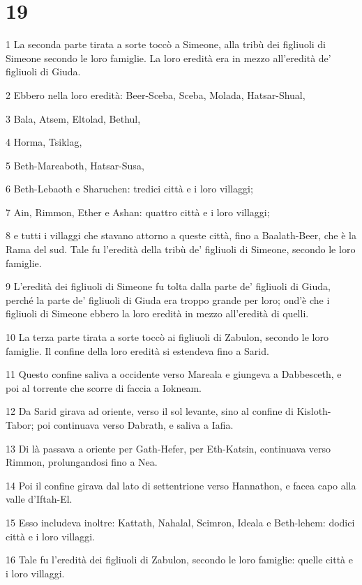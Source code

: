 \chapter{19}

\par 1 La seconda parte tirata a sorte toccò a Simeone, alla tribù dei figliuoli di Simeone secondo le loro famiglie. La loro eredità era in mezzo all'eredità de' figliuoli di Giuda.
\par 2 Ebbero nella loro eredità: Beer-Sceba, Sceba, Molada, Hatsar-Shual,
\par 3 Bala, Atsem, Eltolad, Bethul,
\par 4 Horma, Tsiklag,
\par 5 Beth-Mareaboth, Hatsar-Susa,
\par 6 Beth-Lebaoth e Sharuchen: tredici città e i loro villaggi;
\par 7 Ain, Rimmon, Ether e Ashan: quattro città e i loro villaggi;
\par 8 e tutti i villaggi che stavano attorno a queste città, fino a Baalath-Beer, che è la Rama del sud. Tale fu l'eredità della tribù de' figliuoli di Simeone, secondo le loro famiglie.
\par 9 L'eredità dei figliuoli di Simeone fu tolta dalla parte de' figliuoli di Giuda, perché la parte de' figliuoli di Giuda era troppo grande per loro; ond'è che i figliuoli di Simeone ebbero la loro eredità in mezzo all'eredità di quelli.
\par 10 La terza parte tirata a sorte toccò ai figliuoli di Zabulon, secondo le loro famiglie. Il confine della loro eredità si estendeva fino a Sarid.
\par 11 Questo confine saliva a occidente verso Mareala e giungeva a Dabbesceth, e poi al torrente che scorre di faccia a Iokneam.
\par 12 Da Sarid girava ad oriente, verso il sol levante, sino al confine di Kisloth-Tabor; poi continuava verso Dabrath, e saliva a Iafia.
\par 13 Di là passava a oriente per Gath-Hefer, per Eth-Katsin, continuava verso Rimmon, prolungandosi fino a Nea.
\par 14 Poi il confine girava dal lato di settentrione verso Hannathon, e facea capo alla valle d'Iftah-El.
\par 15 Esso includeva inoltre: Kattath, Nahalal, Scimron, Ideala e Beth-lehem: dodici città e i loro villaggi.
\par 16 Tale fu l'eredità dei figliuoli di Zabulon, secondo le loro famiglie: quelle città e i loro villaggi.

